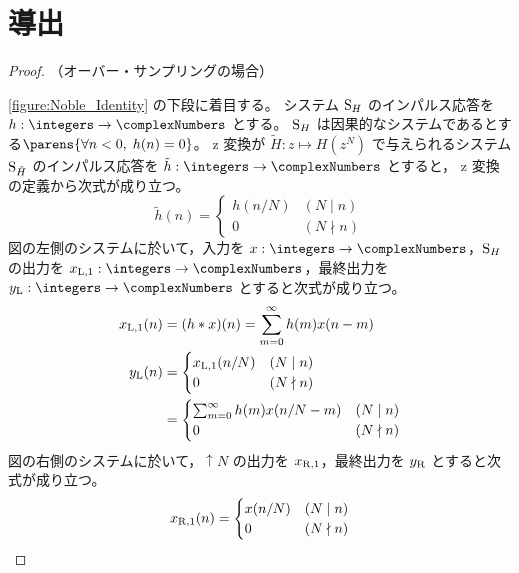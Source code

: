     \section{導出}
        \begin{proof}
            \quad\par\noindent
            （オーバー・サンプリングの場合）
            \par\noindent
            \cref{figure:Noble_Identity} の下段に着目する。
            システム $\mathrm{S}_H$ のインパルス応答を $h:\integers\to\complexNumbers$ とする。
            $\mathrm{S}_H$ は因果的なシステムであるとする$\parens{\forall n<0,\;h(n)=0}$。
            z 変換が $\tilde{H}:z\mapsto H(z^N)$ で与えられるシステム $\mathrm{S}_{\tilde{H}}$ のインパルス応答を $\tilde{h}:\integers\to\complexNumbers$ とすると， z 変換の定義から次式が成り立つ。
            \[
                \tilde{h}(n) = \begin{cases}
                    h(n/N) & (N\mid n) \\
                    0 & (N\nmid n)
                \end{cases} \tag{1}
            \]
            図の左側のシステムに於いて，入力を $x:\integers\to\complexNumbers$，$\mathrm{S}_H$ の出力を $\xLone:\integers\to\complexNumbers$，最終出力を $\yL:\integers\to\complexNumbers$ とすると次式が成り立つ。
            \begin{align*}
                x_{\mathrm{L},1}(n) &= (h*x)(n) = \sum_{m=0}^\infty h(m)x(n-m) \\
                y_{\mathrm{L}}(n) &= \begin{cases}
                    x_{\mathrm{L},1}(n/N) & (N\mid n) \\
                    0 & (N\nmid n)
                \end{cases} \\
                &= \begin{cases}
                    \sum_{m=0}^\infty h(m)x(n/N-m) & (N\mid n) \\
                    0 & (N\nmid n)
                \end{cases}
            \end{align*}
            図の右側のシステムに於いて，$\uparrow N$ の出力を $x_{\mathrm{R},1}$，最終出力を $y_{\mathrm{R}}$ とすると次式が成り立つ。
            \begin{align*}
                \xRone(n) &= \begin{cases}
                    x(n/N) & (N\mid n) \\
                    0 & (N\nmid n)
                \end{cases} \\

\end{align*}
\end{proof}
